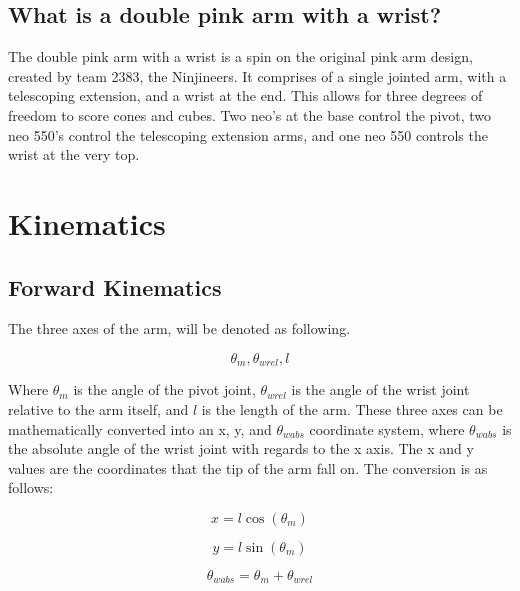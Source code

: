 \documentclass{scrartcl}
\begin{document}
\subsection{What is a double pink arm with a wrist?}
The double pink arm with a wrist is a spin on the original pink arm design, created by team 2383, the Ninjineers. It comprises of a single jointed arm, with a telescoping extension, and a wrist at the end. This allows for three degrees of freedom to score cones and cubes. Two neo's at the base control the pivot, two neo 550's control the telescoping extension arms, and one neo 550 controls the wrist at the very top.

\section{Kinematics}
\subsection{Forward Kinematics}
The three axes of the arm, will be denoted as following. 

\begin{equation} \label{Notation}
    \theta_m,
    \theta_{wrel},
    l
\end{equation}

Where \(\theta_m\) is the angle of the pivot joint, \(\theta_{wrel}\) is the angle of the wrist joint relative to the arm itself, and \(l\) is the length of the arm. These three axes can be mathematically converted into an x, y, and \(\theta_{wabs}\) coordinate system, where \(\theta_{wabs}\) is the absolute angle of the wrist joint with regards to the x axis. The x and y values are the coordinates that the tip of the arm fall on. The conversion is as follows: 

\begin{equation} \label{X Coordinate}
    x = l \cos(\theta_m)
\end{equation}

\begin{equation} \label{Y Coordinate}
    y = l \sin(\theta_m)
\end{equation}

\begin{equation} \label{Pivot Absolute Coordinate}
    \theta_{wabs} = \theta_m + \theta_{wrel}
\end{equation}
\end{document}
